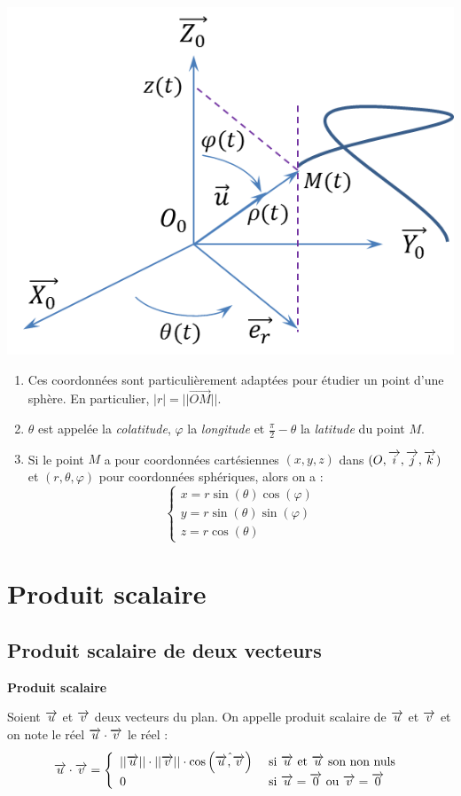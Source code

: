 \documentclass[10pt,oneside]{article}
\begin{document}
\begin{exemple}
\begin{center}
\includegraphics[width=.35\textwidth]{png/coord_spheriques}
\end{center}
\end{exemple}

\begin{rem}

\begin{enumerate}
\item Ces coordonnées sont particulièrement adaptées pour étudier un point d'une sphère. En particulier, $|r|=||\overrightarrow{OM}||$.
\item $\theta$ est appelée la \emph{colatitude}, $\varphi$ la \emph{longitude} et $\frac{\pi}{2}-\theta$ la \emph{latitude} du point $M$.
\item Si le point $M$ a pour coordonnées cartésiennes $(x,y,z)$ dans $(O, \overrightarrow{i}, \overrightarrow{j}, \overrightarrow{k})$ et $(r,\theta,\varphi)$ pour coordonnées sphériques, alors on a :
$$\left\{
\begin{array}{l}
x=r\sin(\theta)\cos(\varphi)\\
y=r\sin(\theta)\sin(\varphi)\\
z=r\cos(\theta)
\end{array}
\right.$$
\end{enumerate}
\end{rem}





\section{Produit scalaire}
\subsection{Produit scalaire de deux vecteurs}
\begin{defi}
\textbf{Produit scalaire}

Soient $\overrightarrow{u}$ et $\overrightarrow{v}$ deux vecteurs du plan. On appelle produit scalaire de $\overrightarrow{u}$ et $\overrightarrow{v}$ et on note le réel $\overrightarrow{u}\cdot\overrightarrow{v}$ le réel : 
$$
\overrightarrow{u}\cdot\overrightarrow{v} = \left\{
\begin{array}{ll}
||\overrightarrow{u}|| \cdot ||\overrightarrow{v}|| \cdot \cos \left(\hat{\overrightarrow{u},\overrightarrow{v}}\right) & \text{ si }  \overrightarrow{u} \text{ et }  \overrightarrow{u} \text{ son non nuls } \\
0 & 
\text{ si }  \overrightarrow{u}=\overrightarrow{0} \text{ ou } \overrightarrow{v}=\overrightarrow{0}
\end{array}
\right.
$$
\end{defi}
\end{document}
